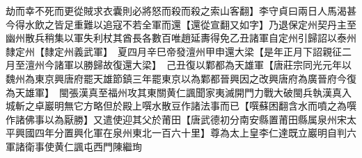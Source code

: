 劫而幸不死而更從賊求衣囊則必將怒而殺而殺之索山客翻】李守貞曰兩日人馬渴甚今得水飲之皆足重難以追寇不若全軍而還【還從宣翻又如字】乃退保定州契丹主至幽州散兵稍集以軍失利杖其酋長各數百唯趙延夀得免乙丑諸軍自定州引歸詔以泰州隸定州【隸定州義武軍】　夏四月辛巳帝發澶州甲申還大梁【是年正月下詔親征二月至澶州今諸軍以勝歸故復還大梁】　己丑復以鄴都為天雄軍【唐莊宗同光元年以魏州為東京興唐府罷天雄節鎮三年罷東京以為鄴都晉興因之改興唐府為廣晉府今復為天雄軍】　閩張漢真至福州攻其東關黄仁諷聞家夷滅開門力戰大破閩兵執漢真入城斬之卓巖明無它方略但於殿上噀水散豆作諸法事而已【噀蘇困翻含水而噴之為噀作諸佛事以為厭勝】又遣使迎其父於莆田【唐武德初分南安縣置莆田縣属泉州宋太平興國四年分置興化軍在泉州東北一百六十里】尊為太上皇李仁達既立巖明自判六軍諸衛事使黄仁諷屯西門陳繼珣